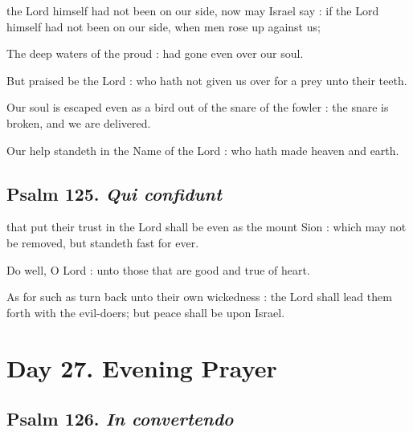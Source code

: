  the Lord himself had not been on our side, now may Israel say : if the Lord himself had not been on our side, when men rose up against us;\par
{}
The deep waters of the proud : had gone even over our soul.\par
{}But praised be the Lord : who hath not given us over for a prey unto their teeth.\par
{}Our soul is escaped even as a bird out of the snare of the fowler : the snare is broken, and we are delivered.\par
{}Our help standeth in the Name of the Lord : who hath made heaven and earth.\par

\subsection{Psalm 125. \textit{Qui confidunt}}

 that put their trust in the Lord shall be even as the mount Sion : which may not be removed, but standeth fast for ever.\par
{}
Do well, O Lord : unto those that are good and true of heart.\par
{}As for such as turn back unto their own wickedness : the Lord shall lead them forth with the evil-doers; but peace shall be upon Israel.\par

\section*{Day 27. Evening Prayer}

\subsection{Psalm 126. \textit{In convertendo}}

